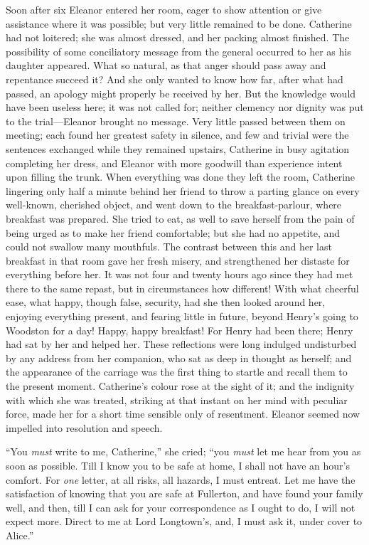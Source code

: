 Soon after six Eleanor entered her room, eager to show attention or give assistance where it was possible; but very little remained to be done. Catherine had not loitered; she was almost dressed, and her packing almost finished. The possibility of some conciliatory message from the general occurred to her as his daughter appeared. What so natural, as that anger should pass away and repentance succeed it? And she only wanted to know how far, after what had passed, an apology might properly be received by her. But the knowledge would have been useless here; it was not called for; neither clemency nor dignity was put to the trial---Eleanor brought no message. Very little passed between them on meeting; each found her greatest safety in silence, and few and trivial were the sentences exchanged while they remained upstairs, Catherine in busy agitation completing her dress, and Eleanor with more goodwill than experience intent upon filling the trunk. When everything was done they left the room, Catherine lingering only half a minute behind her friend to throw a parting glance on every well-known, cherished object, and went down to the breakfast-parlour, where breakfast was prepared. She tried to eat, as well to save herself from the pain of being urged as to make her friend comfortable; but she had no appetite, and could not swallow many mouthfuls. The contrast between this and her last breakfast in that room gave her fresh misery, and strengthened her distaste for everything before her. It was not four and twenty hours ago since they had met there to the same repast, but in circumstances how different! With what cheerful ease, what happy, though false, security, had she then looked around her, enjoying everything present, and fearing little in future, beyond Henry's going to Woodston for a day! Happy, happy breakfast! For Henry had been there; Henry had sat by her and helped her. These reflections were long indulged undisturbed by any address from her companion, who sat as deep in thought as herself; and the appearance of the carriage was the first thing to startle and recall them to the present moment. Catherine's colour rose at the sight of it; and the indignity with which she was treated, striking at that instant on her mind with peculiar force, made her for a short time sensible only of resentment. Eleanor seemed now impelled into resolution and speech.

“You {\em must} write to me, Catherine,” she cried; “you {\em must} let me hear from you as soon as possible. Till I know you to be safe at home, I shall not have an hour's comfort. For {\em one} letter, at all risks, all hazards, I must entreat. Let me have the satisfaction of knowing that you are safe at Fullerton, and have found your family well, and then, till I can ask for your correspondence as I ought to do, I will not expect more. Direct to me at Lord Longtown's, and, I must ask it, under cover to Alice.”


